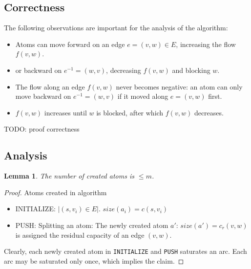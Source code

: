 \documentclass[a4paper,10pt, twocolumn]{article}
\newtheorem{lemma}{Lemma}
\begin{document}
\subsection{Correctness}
\label{sec:gt_correctness}
The following observations are important for the analysis of the algorithm:
\begin{itemize}
	\item Atoms can move forward on an edge $e=(v,w) \in E$, increasing the flow $f(v,w)$.
	\item or backward on $e^{-1}=(w,v)$, decreasing $f(v,w)$ and blocking $w$. 
	\item The flow along an edge $f(v,w)$ never becomes negative: an atom can only move backward on $e^{-1}=(w,v)$ if it moved along $e=(v,w)$ first.
	\item $f(v,w)$ increases until $w$ is blocked, after which $f(v,w)$ decreases.
\end{itemize}

TODO: proof correctness


\subsection{Analysis}
\label{sec:gt_analysis}
\begin{lemma}
The number of created atoms is $\leq m$.
\end{lemma}
\begin{proof}
Atoms created in algorithm
\begin{itemize}
	\item INITIALIZE: $\lvert (s,v_i) \in E \rvert$. $size(a_i) = c(s,v_i)$
	\item PUSH: Splitting an atom: The newly created atom $a'$: $size(a') = c_r(v,w)$ is assigned the residual capacity of an edge $(v,w)$.
\end{itemize}
Clearly, each newly created atom in \lstinline|INITIALIZE| and \lstinline|PUSH| saturates an arc. Each arc may be saturated only once, which implies the claim.
\end{proof}
\end{document}
